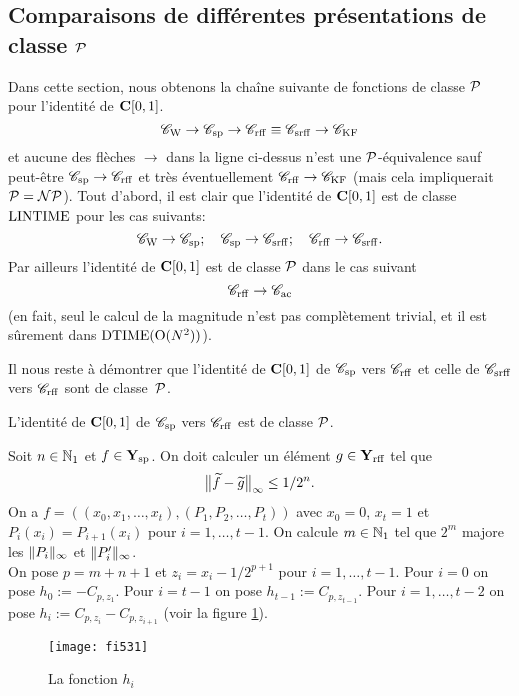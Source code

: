 \subsection {Comparaisons de différentes présentations de classe  
${\cal P}$}\label{fsubsec53}
Dans cette section, nous obtenons la chaîne suivante de fonctions \uni de 
classe  ${\cal P}$  pour l'identité de ${{\bf C}[0,1]}$. 
\[
{{{\mathscr C}}_{\rm W}} \to {{{\mathscr C}}_{\rm sp}} \to {{{\mathscr C}}_{\rm rff}} \equiv {{{\mathscr C}}_{\rm srff}} \to {{{\mathscr C}}_{\rm KF}} 
\] 
et aucune des flèches  $\rightarrow$   dans la ligne ci-dessus n'est une ${\cal P}$-équivalence sauf peut-être  
${{{\mathscr C}}_{\rm sp}}  \rightarrow   {{{\mathscr C}}_{\rm rff}}$  et très éventuellement  ${{{\mathscr C}}_{\rm rff}}  \rightarrow   
{{{\mathscr C}}_{\rm KF}}$  (mais cela impliquerait ${\cal P} = {\cal NP}$).
Tout d'abord, il est clair que l'identité de ${{\bf C}[0,1]}$  est de classe  ${\rm LINTIME} $ 
pour les cas suivants:  
\[
{{{\mathscr C}}_{\rm W}} \rightarrow {{{\mathscr C}}_{\rm sp}}; \quad  {{{\mathscr C}}_{\rm sp}} \to {{{\mathscr C}}_{\rm srff}} ;  \quad  {{{\mathscr C}}_{\rm rff}} \rightarrow {{{\mathscr C}}_{\rm srff}}. 
\]
Par ailleurs l'identité de ${{\bf C}[0,1]}$  est de classe  ${\cal P}$   dans le cas suivant 
\[
{{{\mathscr C}}_{\rm rff}} \rightarrow {{{\mathscr C}}_{\rm ac}} 
\] 
(en fait, seul le calcul de la magnitude n'est pas complètement trivial, et il est sûrement dans ${\rm DTIME} ({\rm O}(N^2))$). 

Il nous reste à démontrer que l'identité de ${{\bf C}[0,1]}$ de  ${{{\mathscr C}}_{\rm sp}}$  vers  ${{{\mathscr C}}_{\rm rff}}$ et celle de  ${{{\mathscr C}}_{\rm srff}}$  vers  ${{{\mathscr C}}_{\rm rff}}$  
sont de classe~${\cal P}$.

\begin{ftheorem} \label{f531}
L'identité de  ${{\bf C}[0,1]}$  de   ${{{\mathscr C}}_{\rm sp}}$  vers  ${{{\mathscr C}}_{\rm rff}}$  est \uni de classe ${\cal P}$.
\end{ftheorem} 
\proof 
Soit  $n \in  \mathbb {N}_1$  et  $f \in  {{\bf Y}_{\rm sp}}$. On doit calculer un élément  
$g \in {{\bf Y}_{\rm rff}} $  tel que  
\[
\big\lVert  \widetilde{f} - \widetilde{g}  \big\rVert_{\infty} \leq 1/2^n.
\] 
On a $f = ((x_0,x_1,\ldots,x_t),(P_1,P_2,\ldots,P_t))$ avec $x_0=0$, $x_t=1$ et 
$P_i(x_i) = P_{i+1}(x_i)$   pour  $i = 1,\ldots,t-1$.   
On calcule   $m \in \mathbb {N}_1$   tel que  $2^m$  majore les 
$\lVert P_i \rVert_{\infty}$ et $\lVert P_i' \rVert_{\infty}$.  \\
On pose $p=m+n+1$ et $z_i = x_i - 1/2^{p+1}$ pour $i=1,\dots,t-1$. Pour  $i = 0$ on pose $h_0 := -C_{p,z_1}$. Pour  $i = t-1$ on pose $h_{t-1} := C_{p,z_{t-1}}$. Pour  $i = 1,\ldots,t-2$ on pose 
 $h_i := C_{p,z_i} - C_{p,z_{i+1}}$   (voir la figure \ref{ffi531}). 

\begin{figure}[htbp]  
\begin{center}
\texttt{[image: fi531]}
\end{center}
\caption[La fonction $h_i$]{\label{ffi531}  
La fonction $h_i$}  
\end{figure}  

